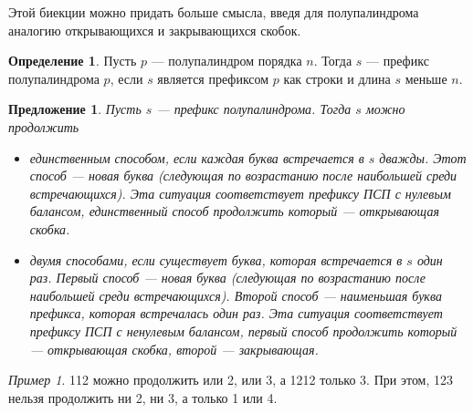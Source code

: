 \documentclass[a4paper,fleqn,12pt,top=0pt]{article}
\theoremstyle{plain}
\newtheorem{proposition}[theorem]{Предложение}
\theoremstyle{definition}
\newtheorem{definition}[theorem]{Определение}
\theoremstyle{remark}
\newtheorem{example}[theorem]{Пример}
\begin{document}
Этой биекции можно придать больше смысла, введя для полупалиндрома аналогию открывающихся и закрывающихся скобок.
\begin{definition}
    Пусть $p$ --- полупалиндром порядка $n$. Тогда $s$ --- префикс полупалиндрома $p$, если $s$ является префиксом $p$ как строки и длина $s$ меньше $n$.
\end{definition}
\begin{proposition}\label{meaning}
    Пусть $s$ --- префикс полупалиндрома. Тогда $s$ можно продолжить 
    \begin{itemize}
        \item единственным способом, если каждая буква встречается в $s$ дважды. Этот способ --- новая буква (следующая по возрастанию после наибольшей среди встречающихся). Эта ситуация соответствует префиксу ПСП с нулевым балансом, единственный способ продолжить который --- открывающая скобка.
        \item двумя способами, если существует буква, которая встречается в $s$ один раз. Первый способ --- новая буква (следующая по возрастанию после наибольшей среди встречающихся). Второй способ --- наименьшая буква префикса, которая встречалась один раз. Эта ситуация соответствует префиксу ПСП с ненулевым балансом, первый способ продолжить который --- открывающая скобка, второй --- закрывающая.
    \end{itemize}

\end{proposition}

\begin{example}
    112 можно продолжить или 2, или 3, а 1212 только 3. При этом, 123 нельзя продолжить ни 2, ни 3, а только 1 или 4.
\end{example}
\end{document}
